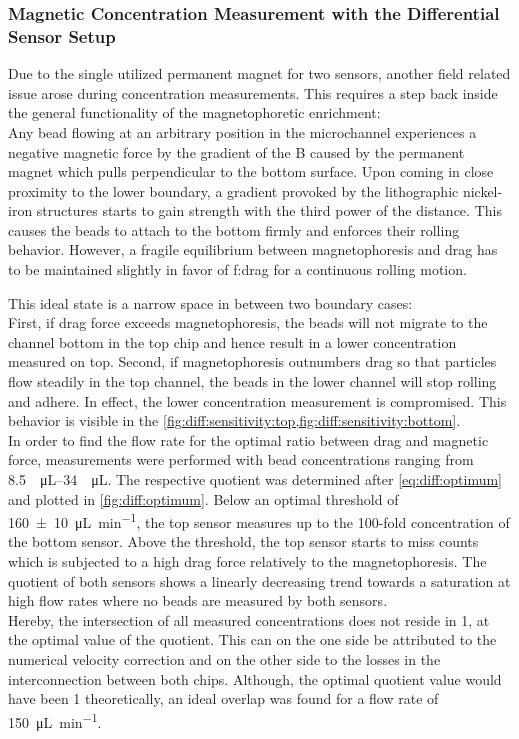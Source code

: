 \subsubsection{Magnetic Concentration Measurement with the Differential Sensor Setup}
Due to the single utilized permanent magnet for two sensors, another field related issue arose during concentration measurements. This requires a step back inside the general functionality of the magnetophoretic enrichment:\\
Any bead flowing at an arbitrary position in the microchannel experiences a negative magnetic force by the gradient of the \acrlong{B} caused by the permanent magnet which pulls perpendicular to the bottom surface. Upon coming in close proximity to the lower boundary, a gradient provoked by the lithographic nickel-iron structures starts to gain strength with the third power of the distance. This causes the beads to attach to the bottom firmly and enforces their rolling behavior. However, a fragile equilibrium between magnetophoresis and drag has to be maintained slightly in favor of \acrlong{f:drag} for a continuous rolling motion.

This ideal state is a narrow space in between two boundary cases:\\
First, if drag force exceeds magnetophoresis, the beads will not migrate to the channel bottom in the top chip and hence result in a lower concentration measured on top. Second, if magnetophoresis outnumbers drag so that particles flow steadily in the top channel, the beads in the lower channel will stop rolling and adhere. In effect, the lower concentration measurement is compromised. This behavior is visible in the \cref{fig:diff:sensitivity:top,fig:diff:sensitivity:bottom}.\\
In order to find the flow rate for the optimal ratio between drag and magnetic force, measurements were performed with bead concentrations ranging from \SIrange{8.5}{34}{\per\micro\liter}. The respective quotient was determined after \cref{eq:diff:optimum} and plotted in \cref{fig:diff:optimum}. Below an optimal threshold of \SI{160+-10}{\micro\liter\per\minute}, the top sensor measures up to the 100-fold concentration of the bottom sensor. Above the threshold, the top sensor starts to miss counts which is subjected to a high drag force relatively to the magnetophoresis. The quotient of both sensors shows a linearly decreasing trend towards a saturation at high flow rates where no beads are measured by both sensors.\\
Hereby, the intersection of all measured concentrations does not reside in \num{1}, at the optimal value of the quotient. This can on the one side be attributed to the numerical velocity correction and on the other side to the losses in the interconnection between both chips. Although, the optimal quotient value would have been \num{1} theoretically, an ideal overlap was found for a flow rate of \SI{150}{\micro\liter\per\minute}.

